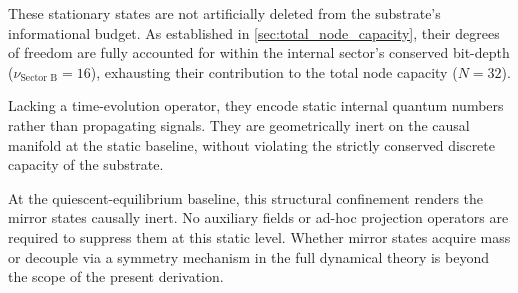 These stationary states are not artificially deleted from the substrate's informational budget. As established in \cref{sec:total_node_capacity}, their degrees of freedom are fully accounted for within the internal sector's conserved bit-depth ($\nu_{\text{Sector B}} = 16$), exhausting their contribution to the total node capacity ($N=32$).

Lacking a time-evolution operator, they encode static internal quantum numbers rather than propagating signals. They are geometrically inert on the causal manifold at the static baseline, without violating the strictly conserved discrete capacity of the substrate.

At the quiescent-equilibrium baseline, this structural confinement renders the mirror states causally inert. No auxiliary fields or ad-hoc projection operators are required to suppress them at this static level. Whether mirror states acquire mass or decouple via a symmetry mechanism in the full dynamical theory is beyond the scope of the present derivation.